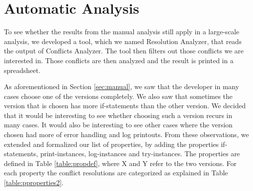 \section{Automatic Analysis}
To see whether the results from the manual analysis still apply in a large-scale analysis, we developed a tool, which we named Resolution Analyzer, that reads the output of Conflicts Analyzer. The tool then filters out those conflicts we are interested in. Those conflicts are then analyzed and the result is printed in a spreadsheet.

As aforementioned in Section \ref{sec:manual}, we saw that the developer in many cases choose one of the versions completely. We also saw that sometimes the version that is chosen has more if-statements than the other version. We decided that it would be interesting to see whether choosing such a version recurs in many cases. It would also be interesting to see other cases where the version chosen had more of error handling and log printouts. From these observations, we extended and formalized our list of properties, by adding the properties if-statements, print-instances, log-instances and try-instances. The properties are defined in Table \ref{table:propdef}, where X and Y refer to the two versions. For each property the conflict resolutions are categorized as explained in Table \ref{table:pproperties2}.


